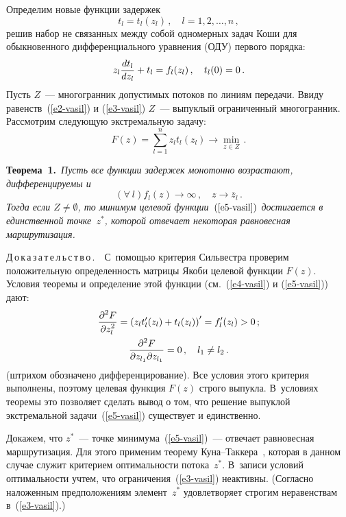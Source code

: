 \begin{multicols}{2}
  Определим новые функции задержек 
  $$
  t_l=t_l(z_l)\,,\quad l=1,2, \ldots ,n\,,
  $$
решив набор не связанных между собой одномерных задач Коши для 
обыкновенного дифференциального уравнения (ОДУ) первого порядка:
\begin{equation}
z_l \displaystyle\frac{\displaystyle dt_l\mathstrut}{\displaystyle dz_l\mathstrut}+t_l =f_l(z_l)\,,\quad t_l(0)=0\,.
\label{e4-vasil}
\end{equation}
Пусть $Z$~--- многогранник допустимых потоков по линиям передачи. Ввиду 
равенств~(\ref{e2-vasil}) и (\ref{e3-vasil}) $Z$~--- выпуклый ограниченный 
многогранник. Рассмотрим следующую экстремальную задачу:
\begin{equation}
F(z)=\sum\limits_{l=1}^n z_l t_l(z_l)\to \min\limits_{z\in Z}\,.
\label{e5-vasil}
\end{equation}
  
  \noindent
  \textbf{Теорема~1.}\ \textit{Пусть все функции задержек монотонно возрастают, 
дифференцируемы и}
  $$
  (\forall\ l) f_l(z)\to \infty\,,\quad z\to \overline{z}_l\,.
  $$
  \textit{Тогда если $Z\not= \emptyset$, то минимум целевой 
  функции~$(\ref{e5-vasil})$ достигается в единственной точке~$z^*$, которой 
отвечает некоторая равновесная маршрутизация.}
  
  \medskip
  
  \noindent
  Д\,о\,к\,а\,з\,а\,т\,е\,л\,ь\,с\,т\,в\,о\,.\ \ С~помощью критерия Сильвестра проверим 
положительную определенность матрицы Якоби целевой функции $F(z)$. Условия 
теоремы и определение этой функции (см.~(\ref{e4-vasil}) и (\ref{e5-vasil})) дают: 
  \begin{gather*}
  \displaystyle\frac{\displaystyle \partial^2 F\mathstrut}{\displaystyle \partial z_l^2\mathstrut} = \left( z_l t_l^\prime(z_l) +t_l (z_l)\right)^\prime 
=f_l^\prime(z_l)>0\,;\\
  \displaystyle\frac{\displaystyle \partial^2 F\mathstrut}{\displaystyle \partial z_{l_1} \partial z_{l_1}\mathstrut}=0\,,\quad l_1\not= l_2\,.
  \end{gather*}
(штрихом обозначено дифференцирование). Все условия этого критерия 
выполнены, поэтому целевая функция $F(z)$ строго выпукла. В~условиях теоремы 
это позволяет сделать вывод о том, что решение выпуклой экстремальной 
задачи~(\ref{e5-vasil}) существует и единственно. 

  Докажем, что $z^*$~--- точке минимума~(\ref{e5-vasil})~--- отвечает равновесная 
маршрутизация. Для этого применим теорему Ку\-на--Так\-ке\-ра~\cite{11-vasil}, 
которая в данном случае служит критерием оптимальности потока~$z^*$. В~записи 
условий оптимальности учтем, что ограничения~(\ref{e3-vasil}) неактивны. 
(Согласно наложенным предположениям элемент~$z^*$ удовлетворяет строгим 
неравенствам в~(\ref{e3-vasil}).) 
  

\end{multicols}
